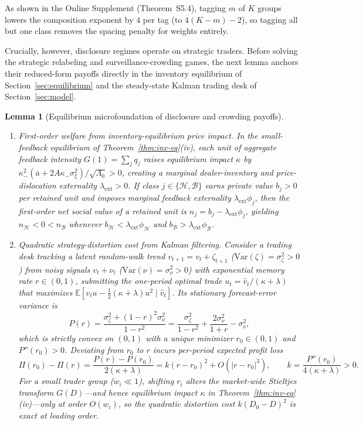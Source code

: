 \documentclass[11pt,letterpaper]{article}
\newtheorem{lemma}[theorem]{Lemma}
\theoremstyle{definition}
\newcommand{\E}{\mathbb{E}}
\newcommand{\Var}{\mathrm{Var}}
\begin{document}
As shown in the Online Supplement (Theorem~S5.4), tagging $m$ of $K$ groups lowers the composition exponent by $4$ per tag (to $4(K-m)-2$), so tagging all but one class removes the spacing penalty for weights entirely.

Crucially, however, disclosure regimes operate on strategic traders. Before solving the strategic relabeling and surveillance-crowding games, the next lemma anchors their reduced-form payoffs directly in the inventory equilibrium of Section~\ref{sec:equilibrium} and the steady-state Kalman trading desk of Section~\ref{sec:model}.

\begin{lemma}[Equilibrium microfoundation of disclosure and crowding payoffs]\label{lem:micro}
\begin{enumerate}
  \item[(i)] \emph{First-order welfare from inventory-equilibrium price impact.} In the small-feedback equilibrium of Theorem~\ref{thm:inv-eq}(iv), each unit of aggregate feedback intensity $G(1) = \sum_j q_j$ raises equilibrium impact $\kappa$ by $\kappa_-^2(\bar{a} + 2A\kappa_-\sigma_\xi^2)/\sqrt{\Lambda_0} > 0$, creating a marginal dealer-inventory and price-dislocation externality $\lambda_{\mathrm{ext}} > 0$. If class $j \in \{\mathcal{H}, \mathcal{B}\}$ earns private value $b_j > 0$ per retained unit and imposes marginal feedback externality $\lambda_{\mathrm{ext}} \phi_j$, then the first-order net social value of a retained unit is $n_j = b_j - \lambda_{\mathrm{ext}} \phi_j$, yielding $n_{\mathcal{H}} < 0 < n_{\mathcal{B}}$ whenever $b_{\mathcal{H}} < \lambda_{\mathrm{ext}}\phi_{\mathcal{H}}$ and $b_{\mathcal{B}} > \lambda_{\mathrm{ext}}\phi_{\mathcal{B}}$.
  \item[(ii)] \emph{Quadratic strategy-distortion cost from Kalman filtering.} Consider a trading desk tracking a latent random-walk trend $v_{t+1} = v_t + \zeta_{t+1}$ ($\Var(\zeta) = \sigma_\zeta^2 > 0$) from noisy signals $v_t + \nu_t$ ($\Var(\nu) = \sigma_\nu^2 > 0$) with exponential memory rate $r \in (0, 1)$, submitting the one-period optimal trade $u_t = \hat{v}_t / (\kappa + \lambda)$ that maximizes $\E[v_t u - \frac{1}{2}(\kappa + \lambda)u^2 \mid \hat{v}_t]$. Its stationary forecast-error variance is
  \[
    P(r) = \frac{\sigma_\zeta^2 + (1 - r)^2 \sigma_\nu^2}{1 - r^2}
         = \frac{\sigma_\zeta^2}{1 - r^2} + \frac{2\sigma_\nu^2}{1 + r} - \sigma_\nu^2,
  \]
  which is strictly convex on $(0, 1)$ with a unique minimizer $r_0 \in (0, 1)$ and $P''(r_0) > 0$. Deviating from $r_0$ to $r$ incurs per-period expected profit loss
  \[
    \Pi(r_0) - \Pi(r) = \frac{P(r) - P(r_0)}{2(\kappa + \lambda)}
    = k (r - r_0)^2 + O\!\left(|r - r_0|^3\right),
    \qquad k = \frac{P''(r_0)}{4(\kappa + \lambda)} > 0.
  \]
  For a small trader group ($w_i \ll 1$), shifting $r_i$ alters the market-wide Stieltjes transform $G(D)$—and hence equilibrium impact $\kappa$ in Theorem~\ref{thm:inv-eq}(iv)—only at order $O(w_i)$, so the quadratic distortion cost $k(D_0 - D)^2$ is exact at leading order.
\end{enumerate}
\end{lemma}
\end{document}
